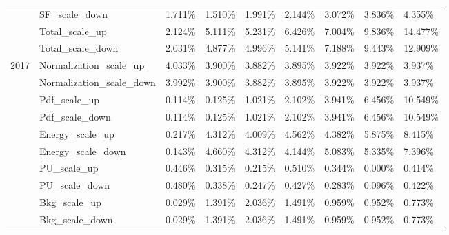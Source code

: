\begin{table}[!htbp]
\begin{center}
{\begin{tabular}{|l|l|l|l|l|l|l|l|l|}
&SF\_scale\_down             & 1.711\%        & 1.510\%        & 1.991\%        &2.144\%        & 3.072\%        & 3.836\%        & 4.355\%    \\\cline{2-9}
&Total\_scale\_up            & 2.124\%        & 5.111\%        & 5.231\%        &6.426\%        & 7.004\%        & 9.836\%        & 14.477\%   \\\cline{2-9}
&Total\_scale\_down          & 2.031\%        & 4.877\%        & 4.996\%        &5.141\%        & 7.188\%        & 9.443\%        & 12.909\%   \\\hline \hline
\multirow{14}{*}{2017}&Normalization\_scale\_up    & 4.033\%        & 3.900\%        & 3.882\%        & 3.895\%        & 3.922\%        & 3.922\%        & 3.937\%        \\\cline{2-9}
&Normalization\_scale\_down  & 3.992\%        & 3.900\%        & 3.882\%        & 3.895\%        & 3.922\%        & 3.922\%        & 3.937\%        \\\cline{2-9}
&Pdf\_scale\_up              & 0.114\%        & 0.125\%        & 1.021\%        & 2.102\%        & 3.941\%        & 6.456\%        & 10.549\%       \\\cline{2-9}
&Pdf\_scale\_down            & 0.114\%        & 0.125\%        & 1.021\%        & 2.102\%        & 3.941\%        & 6.456\%        & 10.549\%       \\\cline{2-9}
&Energy\_scale\_up           & 0.217\%        & 4.312\%        & 4.009\%        & 4.562\%        & 4.382\%        & 5.875\%        & 8.415\%        \\\cline{2-9}
&Energy\_scale\_down         & 0.143\%        & 4.660\%        & 4.312\%        & 4.144\%        & 5.083\%        & 5.335\%        & 7.396\%        \\\cline{2-9}
&PU\_scale\_up               & 0.446\%        & 0.315\%        & 0.215\%        & 0.510\%        & 0.344\%        & 0.000\%        & 0.414\%        \\\cline{2-9}
&PU\_scale\_down             & 0.480\%        & 0.338\%        & 0.247\%        & 0.427\%        & 0.283\%        & 0.096\%        & 0.422\%        \\\cline{2-9}
&Bkg\_scale\_up              & 0.029\%        & 1.391\%        & 2.036\%        & 1.491\%        & 0.959\%        & 0.952\%        & 0.773\%        \\\cline{2-9}
&Bkg\_scale\_down            & 0.029\%        & 1.391\%        & 2.036\%        & 1.491\%        & 0.959\%        & 0.952\%        & 0.773\%        \\\cline{2-9}

\end{tabular}}
\end{center}
\end{table}
